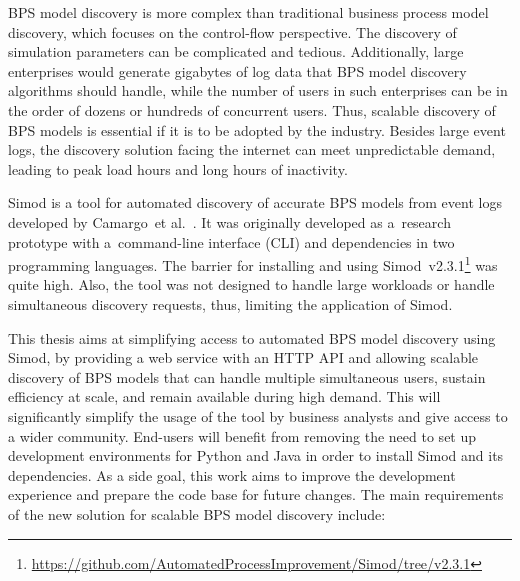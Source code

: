 \documentclass[12pt]{article}
\begin{document}
BPS model discovery is more complex than traditional business process model discovery, which focuses on the control-flow perspective. 
The discovery of simulation parameters can be complicated and tedious. 
Additionally, large enterprises would generate gigabytes of log data that BPS model discovery algorithms should handle, while the number of users in such enterprises can be in the order of dozens or hundreds of concurrent users. 
Thus, scalable discovery of BPS models is essential if it is to be adopted by the industry. 
Besides large event logs, the discovery solution facing the internet can meet unpredictable demand, leading to peak load hours and long hours of inactivity.


Simod is a tool for automated discovery of accurate BPS models from event logs developed by Camargo~et al.~\cite{camargo_automated_2020}. It was originally developed as a~research prototype with a~command-line interface (CLI) and dependencies in two programming languages. The barrier for installing and using Simod~v2.3.1\footnote{\href{https://github.com/AutomatedProcessImprovement/Simod/tree/v2.3.1}{https://github.com/AutomatedProcessImprovement/Simod/tree/v2.3.1}} was quite high. Also, the tool was not designed to handle large workloads or handle simultaneous discovery requests, thus, limiting the application of Simod.

This thesis aims at simplifying access to automated BPS model discovery using Simod, by providing a web service with an HTTP API and allowing scalable discovery of BPS models that can handle multiple simultaneous users, sustain efficiency at scale, and remain available during high demand. This will significantly simplify the usage of the tool by business analysts and give access to a wider community. End-users will benefit from removing the need to set up development environments for Python and Java in order to install Simod and its dependencies. As a side goal, this work aims to improve the development experience and prepare the code base for future changes. The main requirements of the new solution for scalable BPS model discovery include:
\end{document}
